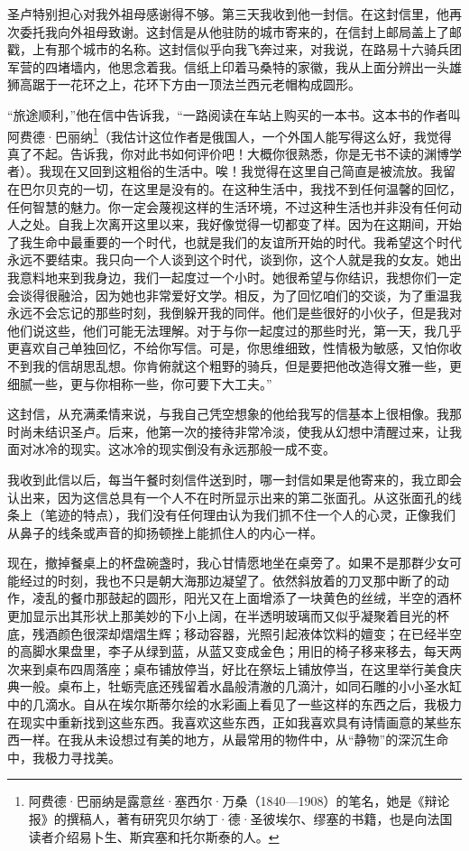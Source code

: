 \par 圣卢特别担心对我外祖母感谢得不够。第三天我收到他一封信。在这封信里，他再次委托我向外祖母致谢。这封信是从他驻防的城市寄来的，在信封上邮局盖上了邮戳，上有那个城市的名称。这封信似乎向我飞奔过来，对我说，在路易十六骑兵团军营的四堵墙内，他思念着我。信纸上印着马桑特的家徽，我从上面分辨出一头雄狮高踞于一花环之上，花环下方由一顶法兰西元老帽构成圆形。
\par “旅途顺利，”他在信中告诉我，“一路阅读在车站上购买的一本书。这本书的作者叫阿费德·巴丽纳\footnote{阿费德·巴丽纳是露意丝·塞西尔·万桑（1840—1908）的笔名，她是《辩论报》的撰稿人，著有研究贝尔纳丁·德·圣彼埃尔、缪塞的书籍，也是向法国读者介绍易卜生、斯宾塞和托尔斯泰的人。}（我估计这位作者是俄国人，一个外国人能写得这么好，我觉得真了不起。告诉我，你对此书如何评价吧！大概你很熟悉，你是无书不读的渊博学者）。我现在又回到这粗俗的生活中。唉！我觉得在这里自己简直是被流放。我留在巴尔贝克的一切，在这里是没有的。在这种生活中，我找不到任何温馨的回忆，任何智慧的魅力。你一定会蔑视这样的生活环境，不过这种生活也并非没有任何动人之处。自我上次离开这里以来，我好像觉得一切都变了样。因为在这期间，开始了我生命中最重要的一个时代，也就是我们的友谊所开始的时代。我希望这个时代永远不要结束。我只向一个人谈到这个时代，谈到你，这个人就是我的女友。她出我意料地来到我身边，我们一起度过一个小时。她很希望与你结识，我想你们一定会谈得很融洽，因为她也非常爱好文学。相反，为了回忆咱们的交谈，为了重温我永远不会忘记的那些时刻，我倒躲开我的同伴。他们是些很好的小伙子，但是我对他们说这些，他们可能无法理解。对于与你一起度过的那些时光，第一天，我几乎更喜欢自己单独回忆，不给你写信。可是，你思维细致，性情极为敏感，又怕你收不到我的信胡思乱想。你肯俯就这个粗野的骑兵，但是要把他改造得文雅一些，更细腻一些，更与你相称一些，你可要下大工夫。”
\par 这封信，从充满柔情来说，与我自己凭空想象的他给我写的信基本上很相像。我那时尚未结识圣卢。后来，他第一次的接待非常冷淡，使我从幻想中清醒过来，让我面对冰冷的现实。这冰冷的现实倒没有永远那般一成不变。
\par 我收到此信以后，每当午餐时刻信件送到时，哪一封信如果是他寄来的，我立即会认出来，因为这信总具有一个人不在时所显示出来的第二张面孔。从这张面孔的线条上（笔迹的特点），我们没有任何理由认为我们抓不住一个人的心灵，正像我们从鼻子的线条或声音的抑扬顿挫上能抓住人的内心一样。
\par 现在，撤掉餐桌上的杯盘碗盏时，我心甘情愿地坐在桌旁了。如果不是那群少女可能经过的时刻，我也不只是朝大海那边凝望了。依然斜放着的刀叉那中断了的动作，凌乱的餐巾那鼓起的圆形，阳光又在上面增添了一块黄色的丝绒，半空的酒杯更加显示出其形状上那美妙的下小上阔，在半透明玻璃而又似乎凝聚着目光的杯底，残酒颜色很深却熠熠生辉；移动容器，光照引起液体饮料的嬗变；在已经半空的高脚水果盘里，李子从绿到蓝，从蓝又变成金色；用旧的椅子移来移去，每天两次来到桌布四周落座；桌布铺放停当，好比在祭坛上铺放停当，在这里举行美食庆典一般。桌布上，牡蛎壳底还残留着水晶般清澈的几滴汁，如同石雕的小小圣水缸中的几滴水。自从在埃尔斯蒂尔绘的水彩画上看见了一些这样的东西之后，我极力在现实中重新找到这些东西。我喜欢这些东西，正如我喜欢具有诗情画意的某些东西一样。在我从未设想过有美的地方，从最常用的物件中，从“静物”的深沉生命中，我极力寻找美。
